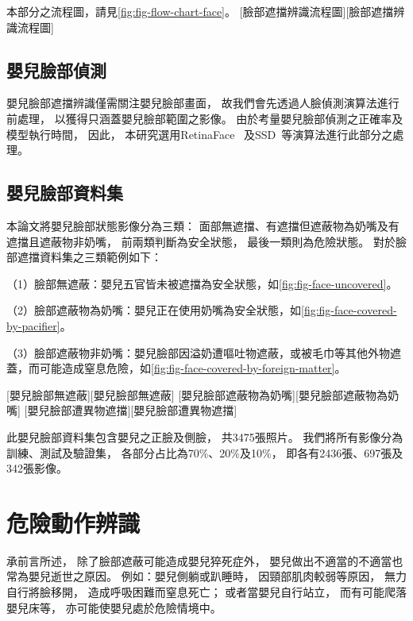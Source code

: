 \documentclass[class=NCU_thesis, crop=false]{standalone}
\begin{document}
本部分之流程圖，請見\cref{fig:fig-flow-chart-face}。
[臉部遮擋辨識流程圖][臉部遮擋辨識流程圖]

\subsection{嬰兒臉部偵測}
嬰兒臉部遮擋辨識僅需關注嬰兒臉部畫面，
故我們會先透過人臉偵測演算法進行前處理，
以獲得只涵蓋嬰兒臉部範圍之影像。
由於考量嬰兒臉部偵測之正確率及模型執行時間，
因此，
本研究選用RetinaFace~\cite{deng_retinaface_2020}
及SSD~\cite{ye_face_2021}等演算法進行此部分之處理。

\subsection{嬰兒臉部資料集}
本論文將嬰兒臉部狀態影像分為三類：
面部無遮擋、有遮擋但遮蔽物為奶嘴及有遮擋且遮蔽物非奶嘴，
前兩類判斷為安全狀態，
最後一類則為危險狀態。
對於臉部遮擋資料集之三類範例如下：

（1）臉部無遮蔽：嬰兒五官皆未被遮擋為安全狀態，如\cref{fig:fig-face-uncovered}。

（2）臉部遮蔽物為奶嘴：嬰兒正在使用奶嘴為安全狀態，如\cref{fig:fig-face-covered-by-pacifier}。

（3）臉部遮蔽物非奶嘴：嬰兒臉部因溢奶遭嘔吐物遮蔽，或被毛巾等其他外物遮蓋，而可能造成窒息危險，如\cref{fig:fig-face-covered-by-foreign-matter}。

[嬰兒臉部無遮蔽][嬰兒臉部無遮蔽]
[嬰兒臉部遮蔽物為奶嘴][嬰兒臉部遮蔽物為奶嘴]
[嬰兒臉部遭異物遮擋][嬰兒臉部遭異物遮擋]

此嬰兒臉部資料集包含嬰兒之正臉及側臉，
共3475張照片。
我們將所有影像分為訓練、測試及驗證集，
各部分占比為70\%、20\%及10\%，
即各有2436張、697張及342張影像。

\section{危險動作辨識}
承前言所述，
除了臉部遮蔽可能造成嬰兒猝死症外，
嬰兒做出不適當的不適當也常為嬰兒逝世之原因。
例如：嬰兒側躺或趴睡時，
因頸部肌肉較弱等原因，
無力自行將臉移開，
造成呼吸困難而窒息死亡；
或者當嬰兒自行站立，
而有可能爬落嬰兒床等，
亦可能使嬰兒處於危險情境中。
\end{document}
